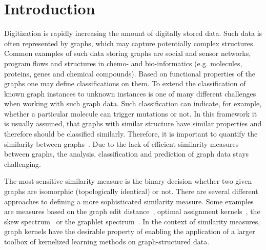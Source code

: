 \section{Introduction} \label{sec:Introduction}
Digitization is rapidly increasing the amount of digitally stored data.
Such data is often represented by graphs, which may capture potentially complex structures.
Common examples of such data storing graphs are social and sensor networks, program flows and structures in chemo- and bio-informatics (e.g. molecules, proteins, genes and chemical compounds). 
Based on functional properties of the graphs one may define classifications on them. 
To extend the classification of known graph instances to unknown instances is one of many different challenges when working with such graph data. 
Such classification can indicate, for example, whether a particular molecule can trigger mutations or not. 
In this framework it is usually assumed, that graphs with similar structure have similar properties and therefore should be classified similarly.
Therefore, it is important to quantify the similarity between graphs~\cite{2011_Shervashidze_JMLR}. 
Due to the lack of efficient similarity measures between graphs, the analysis, classification and prediction of graph data stays challenging.

The most sensitive similarity measure is the binary decision whether two given graphs are isomorphic (topologically identical) or not.
There are several different approaches to defining a more sophisticated similarity measure.
Some examples are measures based on the graph edit distance~\cite{1983_Bunke_ELSEVIER,2005_Froehlich_ICML}, optimal assignment kernels~\cite{2005_Froehlich_ICML}, the
skew spectrum~\cite{2008_Kondor_ICML} or the graphlet spectrum~\cite{2009_Kondor_ICML,2009_Shervashidze_NIPS}. %
In the context of similarity measures, graph kernels have the desirable property of enabling the application of a larger toolbox of kernelized learning methods on graph-structured data.

